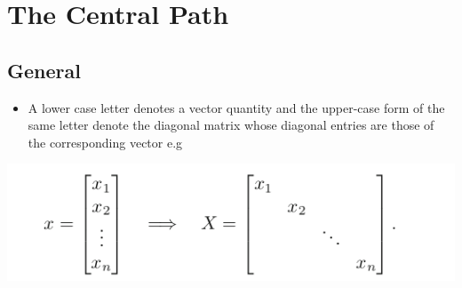 \documentclass[11pt]{article}
\begin{document}
\section{The Central Path}
\label{sec:org8a9d7c3}
\subsection{General}
\label{sec:org4188274}
\begin{itemize}
\item A lower case letter denotes a vector quantity and the upper-case form of the same letter denote the diagonal matrix whose diagonal entries are those of the corresponding vector e.g
\end{itemize}
\begin{center}
\includegraphics[width=.9\linewidth]{The Central Path/screenshot_2019-03-10_13-56-22.png}
\end{center}
\end{document}
